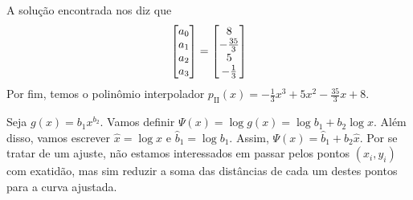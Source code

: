 \documentclass{homework}
\begin{document}
	A solução encontrada nos diz que
		$$
		\left[\begin{array}{@{}c@{}} %
		a_0\\
		a_1\\
		a_2\\
		a_3
		\end{array}\right]
		=		
		\left[\begin{array}{@{}c@{}} %
		8\\
		-\frac{35}{3}\\
		5\\
		-\frac{1}{3}
		\end{array}\right]
		$$
	Por fim, temos o polinômio interpolador $p_\text{II}(x) = -\frac{1}{3} x^3 + 5 x^2 -\frac{35}{3} x + 8$.
	
	\quest%
	
	Seja $g(x) = b_1 x^{b_2}$. Vamos definir $\varPsi(x) = \log g(x) = \log b_1 + b_2 \log x$. Além disso, vamos escrever $\hat{x} = \log x$ e $\hat{b}_1 = \log b_1$. Assim,  $\varPsi(x) = \hat{b}_1 + b_2 \hat{x}$. Por se tratar de um ajuste, não estamos interessados em passar pelos pontos $(x_i, y_i)$ com exatidão, mas sim reduzir a soma das distâncias de cada um destes pontos para a curva ajustada.\par
	
\end{document}
